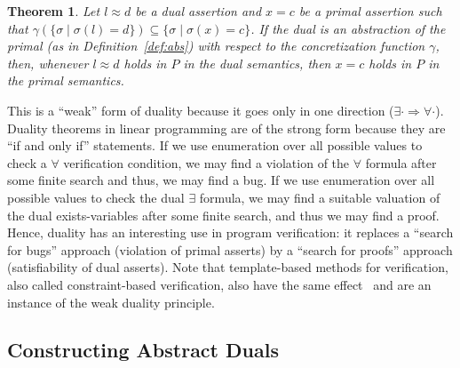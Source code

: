 \documentclass[preprint]{sig-alternate-05-2015}
\newtheorem{theorem}{Theorem}
\newcommand\ignore[1]{{}}
\def\ds{{\mathit{\theta}}}   %
\begin{document}
\begin{theorem}\label{thm:duality}
  Let $l\approx d$ be a dual assertion and $x=c$ be a primal assertion
  such that $\gamma(\{\sigma \mid \sigma(l)=d\}) \subseteq \{\sigma \mid \sigma(x)=c\}$.
  If the dual is an abstraction of the primal (as in Definition~\ref{def:abs})
  with respect to the concretization function $\gamma$,
  then, whenever
  $l \approx d$ holds in $P$ in the dual semantics, then
  $x = c$ holds in $P$ in the primal semantics.
\end{theorem}
\ignore{
\begin{proof}
  Let $\ds\in\semt(P)(U')$.
  Since $l\approx d$ holds in $P$ in the dual semantics,
  it follows that $\ds(l)=d$.
  Let $\sigma\in\sem(P)(U)$ be any reachable primal state.
  We need to show that $\sigma(x)=c$.
  Since the dual semantics is an abstraction of the primal,
  it follows from Theorem~\ref{thm:duality} that
  $\sigma\in\gamma(\ds)$.
  Since we assumed that
  $\gamma(\{\sigma \mid \sigma(l)=d\}) \subseteq \{\sigma \mid \sigma(x)=c\}$,
  and since $\ds(l)=d$,
  it follows that
  $\gamma(\ds) \subseteq \{\sigma \mid \sigma(x)=c\}$.
  Since $\sigma\in\gamma(\ds)$,
  it follows that $\sigma\in \{\sigma \mid \sigma(x)=c\}$,
  which implies $\sigma(x)=c$.
\end{proof}
\endignore}

This is a ``weak'' form of duality because it goes only in one direction
($\exists\cdot\Rightarrow\forall\cdot$).
Duality theorems in linear programming are of the strong form because
they are ``if and only if'' statements. %
If we use enumeration over all possible values to check a
$\forall$ verification condition, we may find a violation of the $\forall$ formula
after some finite search and thus, we may find a bug.
If we use enumeration over all possible values to check the dual
$\exists$ formula, we may find a suitable valuation of the dual exists-variables 
after some finite search, and thus we may find a proof.
Hence, duality has an interesting use in program verification: it replaces a 
``search for bugs'' approach (violation of primal asserts)
by a ``search for proofs'' approach (satisfiability of dual asserts).
Note that template-based methods for verification, also called
constraint-based verification, also have the same effect~\cite{Gulwani08:PLDI,Gulwani13:STTT}
and are an instance of the weak duality principle.

\subsection{Constructing Abstract Duals}\label{sec:findingduals}
\end{document}
